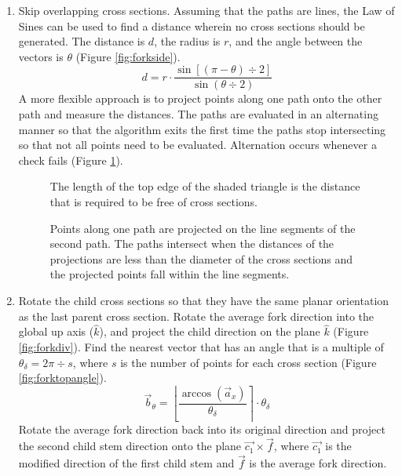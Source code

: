 \documentclass[10pt]{article}
\begin{document}
\begin{enumerate}
\item Skip overlapping cross sections. Assuming that the paths are lines, the Law of Sines can be used to find a distance wherein no cross sections should be generated. The distance is $ d $, the radius is $ r $, and the angle between the vectors is $ \theta $ (Figure \ref{fig:forkside}).
\[ d = r \cdot \frac{\sin[(\pi-\theta)\div2]}{\sin (\theta\div2)} \]
A more flexible approach is to project points along one path onto the other path and measure the distances. The paths are evaluated in an alternating manner so that the algorithm exits the first time the paths stop intersecting so that not all points need to be evaluated. Alternation occurs whenever a check fails (Figure \ref{fig:path}).

\begin{figure}[H]
 \begin{minipage}[b]{0.46\textwidth}
  \centering
  
  \caption{The length of the top edge of the shaded triangle is the distance that is required to be free of cross sections.} \label{fig:forkside}
 \end{minipage}
 \hfill
 \begin{minipage}[b]{0.46\textwidth}
  \centering
  
  \caption{Points along one path are projected on the line segments of the second path. The paths intersect when the distances of the projections are less than the diameter of the cross sections and the projected points fall within the line segments.} \label{fig:path}
 \end{minipage}
\end{figure}

\item Rotate the child cross sections so that they have the same planar orientation as the last parent cross section. Rotate the average fork direction into the global up axis ($ \hat{k} $), and project the child direction on the plane $ \hat{k} $ (Figure \ref{fig:forkdiv}). Find the nearest vector that has an angle that is a multiple of $ \theta_{\delta} = 2 \pi \div s $, where $ s $ is the number of points for each cross section (Figure \ref{fig:forktopangle}).
\[ \vec{b}_{\theta} = \left \lfloor \frac{\arccos(\vec{a}_x)}{\theta_{\delta}} \right\rceil \cdot \theta_{\delta} \]
Rotate the average fork direction back into its original direction and project the second child stem direction onto the plane $ \vec{c_1} \times \vec{f} $, where $ \vec{c_1} $ is the modified direction of the first child stem and $ \vec{f} $ is the average fork direction.


\end{enumerate}
\end{document}
